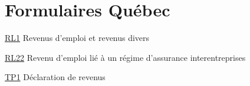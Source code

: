 \chapter*{Formulaires Québec}

\href{https://www.revenuquebec.ca/fr/services-en-ligne/formulaires-et-publications/details-courant/rl-1/}{RL1}
Revenus d'emploi et revenus divers

\href{https://www.revenuquebec.ca/fr/services-en-ligne/formulaires-et-publications/details-courant/rl-22/}{RL22}
Revenu d'emploi lié à un régime d'assurance interentreprises

\href{https://www.revenuquebec.ca/fr/services-en-ligne/formulaires-et-publications/details-courant/tp-1/}{TP1}
Déclaration de revenus